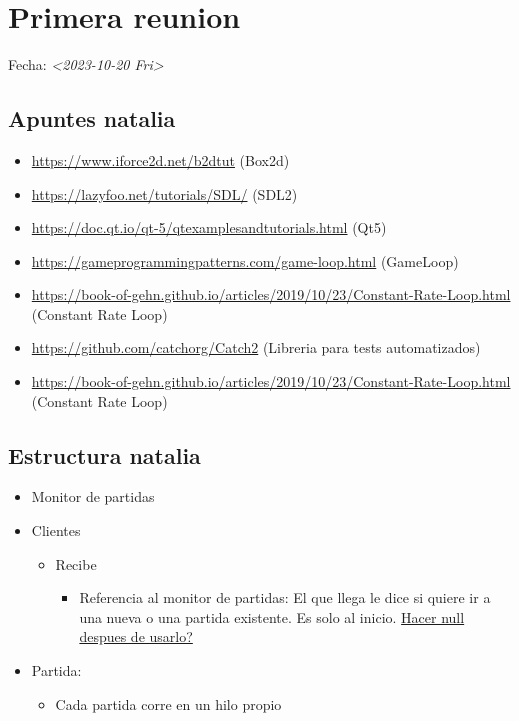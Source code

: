 \documentclass[11pt]{article}
\date{\today}
\title{}
\begin{document}
\tableofcontents

\section{Primera reunion}
\label{sec:org3a75765}
Fecha: \textit{<2023-10-20 Fri>}

\subsection{Apuntes natalia}
\label{sec:org4674de3}
\begin{itemize}
\item \url{https://www.iforce2d.net/b2dtut} (Box2d)
\item \url{https://lazyfoo.net/tutorials/SDL/} (SDL2)
\item \url{https://doc.qt.io/qt-5/qtexamplesandtutorials.html} (Qt5)
\item \url{https://gameprogrammingpatterns.com/game-loop.html} (GameLoop)
\item \url{https://book-of-gehn.github.io/articles/2019/10/23/Constant-Rate-Loop.html} (Constant Rate Loop)
\item \url{https://github.com/catchorg/Catch2} (Libreria para tests automatizados)
\item \url{https://book-of-gehn.github.io/articles/2019/10/23/Constant-Rate-Loop.html} (Constant Rate Loop)
\end{itemize}
\subsection{Estructura natalia}
\label{sec:org6bcd2d5}
\begin{itemize}
\item Monitor de partidas
\item Clientes
\begin{itemize}
\item Recibe
\begin{itemize}
\item Referencia al monitor de partidas:
El que llega le dice si quiere ir a una nueva o una partida existente. Es solo al inicio. \uline{Hacer null despues de usarlo?}
\end{itemize}
\end{itemize}
\item Partida:
\begin{itemize}
\item Cada partida corre en un hilo propio
\end{itemize}
\end{itemize}
\end{document}
